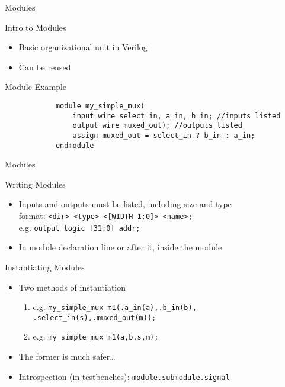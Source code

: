 \documentclass[table,dvipsnames,colorlinks=true]{beamer}
\begin{document}
\begin{frame}[fragile]{Modules}
    \begin{block}{Intro to Modules}
        \begin{itemize}
            \item Basic organizational unit in Verilog
            \item Can be reused
        \end{itemize}
    \end{block}
    \begin{block}{Module Example}
        \begin{verbatim}
            module my_simple_mux(
                input wire select_in, a_in, b_in; //inputs listed
                output wire muxed_out); //outputs listed
                assign muxed_out = select_in ? b_in : a_in;
            endmodule
        \end{verbatim}
    \end{block}
\end{frame}

\begin{frame}{Modules}
    \begin{block}{Writing Modules}
        \begin{itemize}
            \item Inputs and outputs must be listed, including size and type \\
                format: \texttt{<dir> <type> <[WIDTH-1:0]> <name>;} \\
                e.g. \texttt{output logic [31:0] addr;}
            \item In module declaration line or after it, inside the module
        \end{itemize}
    \end{block}
    \begin{block}{Instantiating Modules}
        \begin{itemize}
            \item Two methods of instantiation
                \begin{enumerate}
                    \item e.g. \texttt{my\_simple\_mux
                        m1(.a\_in(a),.b\_in(b), \\ \hfill.select\_in(s),.muxed\_out(m));}
                    \item e.g. \texttt{my\_simple\_mux m1(a,b,s,m);}
                \end{enumerate}
            \item The former is much safer\dots
            \item Introspection (in testbenches): \texttt{module.submodule.signal}
        \end{itemize}
    \end{block}
\end{frame}
\end{document}
